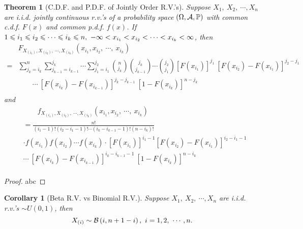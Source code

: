 \documentclass[openany,12pt]{book}
\newtheorem{theorem}{Theorem}[chapter]
\newtheorem{corollary}{Corollary}[chapter]
\begin{document}
\begin{theorem}[C.D.F. and P.D.F. of Jointly Order R.V.'s]
Suppose $X_{1},\ X_{2},\ \cdots,X_{n}$ are i.i.d. jointly continuous r.v.'s of a probability space $(\Omega,\mathcal{A},\mathbb{P})$ with common c.d.f. $F(x)$ and common p.d.f. $f(x)$. If
$1 \leqslant i_{1} \leqslant i_{2} \leqslant \cdots \leqslant i_{k} \leqslant n,\  - \infty < x_{i_{1}} < x_{i_{2}} < \cdots < x_{i_{k}} < \infty$, then
\[\begin{aligned}
&F_{X_{\left(i_{1}\right)},X_{\left(i_{2}\right)},\ \cdots,X_{\left(i_{k}\right)}}\left( x_{i_{1}},x_{i_{2}},\ \cdots,\ x_{i_{k}} \right)\\
=& \sum_{j_{k} = i_{k}}^{n}{\sum_{j_{k - 1} = i_{k - 1}}^{j_{k}}\cdots}\sum_{j_{1} = i_{1}}^{j_{2}} \binom{n}{j_{k}}\binom{j_{k}}{j_{k - 1}} \cdots \binom{j_{2}}{j_{1}}\left[ F\left( x_{i_{1}} \right) \right]^{j_{1}}\ \left[ F\left( x_{i_{2}} \right) - F\left( x_{i_{1}} \right) \right]^{j_{2} - j_{1}}\\
&\qquad\cdots\ \left[ F\left( x_{i_{k}} \right) - F\left( x_{i_{k - 1}} \right) \right]^{j_{k} - j_{k - 1}}\ \left[ 1 - F\left( x_{i_{k}} \right) \right]^{n - j_{k}}\\
\end{aligned}\]
and
\[\begin{aligned}
&\qquad f_{X_{\left(i_{1}\right)},X_{\left(i_{2}\right)},\ \cdots,X_{\left(i_{k}\right)}}\left( x_{i_{1}},x_{i_{2}},\ \cdots,\ x_{i_{k}} \right)\\
&= \frac{n!}{\left( i_{1} - 1 \right)!\left( i_{2} - i_{1} - 1 \right)!\cdots\left( i_{k} - i_{k - 1} - 1 \right)!\left( n - i_{k} \right)!}\\
&\cdot f\left( x_{i_{1}} \right)f\left( x_{i_{2}} \right)\cdots f\left( x_{i_{k}} \right)\cdot \left[ F\left( x_{i_{1}} \right) \right]^{i_{1} - 1}\left[ F\left( x_{i_{2}} \right) - F\left( x_{i_{1}} \right) \right]^{i_{2} - i_{1} - 1}\\
&\cdots\ \left[ F\left( x_{i_{k}} \right) - F\left( x_{i_{k - 1}} \right) \right]^{i_{k} - i_{k - 1} - 1}\ \left[ 1 - F\left( x_{i_{k}} \right) \right]^{n - i_{k}}\\
\end{aligned}\]
\vspace{0.01cm}
\end{theorem}

\begin{proof}
  abc
\end{proof}

\begin{corollary}[Beta R.V. vs Binomial R.V.]
Suppose $X_{1},\ X_{2},\ \cdots,X_{n}$ are i.i.d. r.v.'s $\sim U(0,1)$, then
\[X_{(i)}\sim\mathcal{B}\left( i,n + 1 - i \right),\ i = 1,2,\ \cdots,n.\]
\end{corollary}
\end{document}
